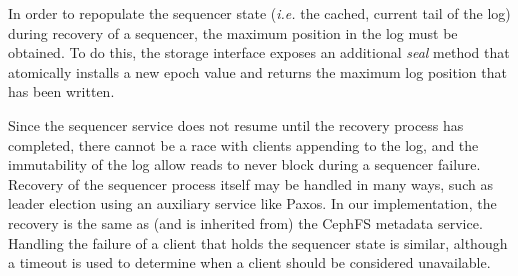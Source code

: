 In order to repopulate the sequencer state ({\it i.e.} the cached, current tail
of the log) during recovery of a sequencer, the maximum position in the log
must be obtained. To do this, the storage interface exposes an additional
\emph{seal} method that atomically installs a new epoch value and returns the
maximum log position that has been written.

Since the sequencer service does not resume until the recovery process has
completed, there cannot be a race with clients appending to the log, and the
immutability of the log allow reads to never block during a sequencer failure.
Recovery of the sequencer process itself may be handled in many ways, such as
leader election using an auxiliary service like Paxos. In our
implementation, the recovery is the same as (and is inherited from) the CephFS
metadata service. Handling the failure of a client that holds the sequencer
state is similar, although a timeout is used to determine when a client should
be considered unavailable.

